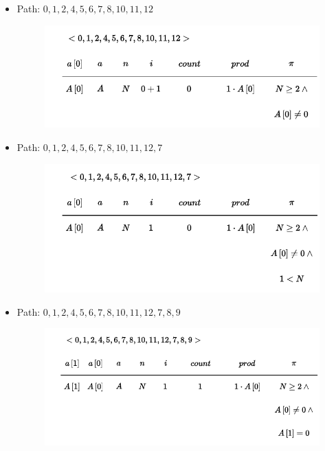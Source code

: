 \begin{itemize}
    \newpage

    \item Path: $0, 1, 2, 4, 5, 6, 7, 8, 10, 11, 12$
    \begin{figure}[!htp]
        \centering
        \includegraphics[width=.8\textwidth]{img/symbolic-execution-9.pdf}
    \end{figure}

    \item Path: $0, 1, 2, 4, 5, 6, 7, 8, 10, 11, 12, 7$
    \begin{figure}[!htp]
        \centering
        \includegraphics[width=.8\textwidth]{img/symbolic-execution-10.pdf}
    \end{figure}

    \item Path: $0, 1, 2, 4, 5, 6, 7, 8, 10, 11, 12, 7, 8, 9$
    \begin{figure}[!htp]
        \centering
        \includegraphics[width=.8\textwidth]{img/symbolic-execution-11.pdf}
    \end{figure}

    \newpage


\end{itemize}
